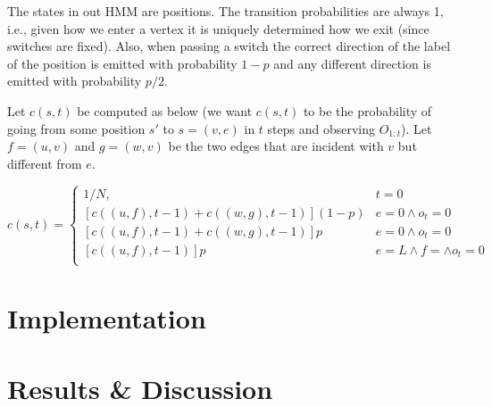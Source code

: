\documentclass[a4paper,11pt]{kth-mag}
\begin{document}
    The states in out HMM are positions. The transition probabilities are
    always 1, i.e., given how we enter a vertex it is uniquely determined how
    we exit (since switches are fixed). Also, when passing a switch the correct
    direction of the label of the position is emitted with probability $1-p$
    and any different direction is emitted with probability $p/2$.

    Let $c(s,t)$ be computed as below (we want $c(s,t)$ to be the probability
    of going from some position $s'$ to $s=(v,e)$ in $t$ steps and observing
    $O_{1:t}$). Let $f=(u,v)$ and $g=(w,v)$ be the two edges that are incident
    with $v$ but different from $e$.

    \begin{equation}
        c(s,t) =
        \begin{cases}
            1/N, & t = 0 \\
            \left[c((u,f),t-1) + c((w,g),t-1)\right](1-p) & e = 0 \wedge o_t = 0 \\
            \left[c((u,f),t-1) + c((w,g),t-1)\right]p     & e = 0 \wedge o_t = 0 \\
            \left[c((u,f),t-1)               \right]p     & e = L \wedge f=\wedge o_t = 0 \\
        \end{cases}
    \end{equation}

    \chapter{Implementation}
        
    \chapter{Results \& Discussion}
        
\end{document}
